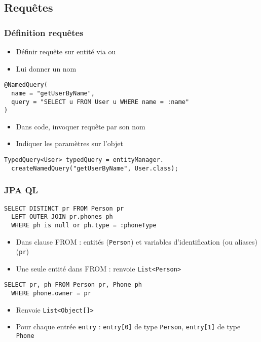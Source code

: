\documentclass[french, english]{beamer}
\begin{document}
\subsection{Requêtes}
\begin{frame}[fragile]
	\frametitle{Définition requêtes}
	\begin{itemize}
		\item Définir requête sur entité via  {\tiny ou  }
		\item Lui donner un nom
	\end{itemize}
	\begin{lstlisting}[basicstyle=\small]
@NamedQuery(
  name = "getUserByName",
  query = "SELECT u FROM User u WHERE name = :name"
)
	\end{lstlisting}
	\begin{itemize}
		\item Dans code, invoquer requête par son nom
		\item Indiquer les paramètres sur l’objet 
	\end{itemize}
	\begin{lstlisting}
TypedQuery<User> typedQuery = entityManager.
  createNamedQuery("getUserByName", User.class);
	\end{lstlisting}
\end{frame}

\begin{frame}[fragile]
	\frametitle{JPA QL}
	\begin{lstlisting}
SELECT DISTINCT pr FROM Person pr 
  LEFT OUTER JOIN pr.phones ph 
  WHERE ph is null or ph.type = :phoneType
	\end{lstlisting}
	\begin{itemize}
		\item Dans clause FROM : entités (\texttt{Person}) et variables d’identification (ou aliases) (\texttt{pr})
		\item Une seule entité dans FROM : renvoie \texttt{List<Person>}
	\end{itemize}
	\begin{lstlisting}
SELECT pr, ph FROM Person pr, Phone ph 
  WHERE phone.owner = pr
	\end{lstlisting}
	\begin{itemize}
		\item Renvoie \texttt{List<Object[]>}
		\item Pour chaque entrée \texttt{entry} : \texttt{entry[0]} de type \texttt{Person}, \texttt{entry[1]} de type \texttt{Phone}
	\end{itemize}
\end{frame}
\end{document}
